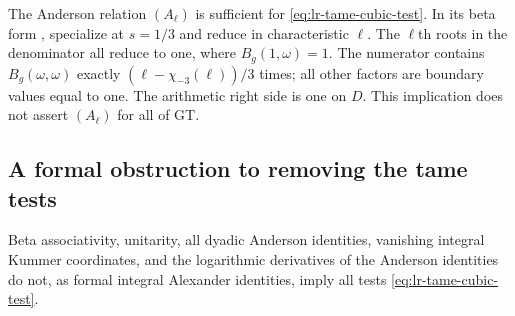 The Anderson relation $(A_\ell)$ is sufficient for
\eqref{eq:lr-tame-cubic-test}. In its beta form
\cite[Remark~2.4]{Furusho2003}, specialize at $s=1/3$ and
reduce in characteristic $\ell$. The $\ell$th roots in the
denominator all reduce to one, where $B_g(1,\omega)=1$.
The numerator contains $B_g(\omega,\omega)$ exactly
$(\ell-\chi_{-3}(\ell))/3$ times; all other factors are boundary
values equal to one. The arithmetic right side is one on $D$.
This implication does not assert $(A_\ell)$ for all of GT.

\subsection{A formal obstruction to removing the tame tests}

\begin{proposition}\label{prop:lr-formal-beta-obstruction}
Beta associativity, unitarity, all dyadic Anderson identities,
vanishing integral Kummer coordinates, and the logarithmic
derivatives of the Anderson identities do not, as formal integral
Alexander identities, imply all tests
\eqref{eq:lr-tame-cubic-test}.
\end{proposition}
